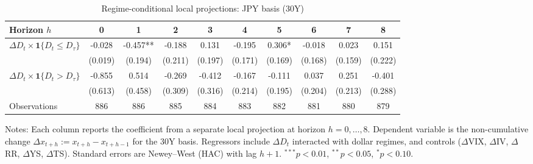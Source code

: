 \begin{table}[!htbp]\centering
\caption{Regime-conditional local projections: JPY basis (30Y)}
\label{tab:lp_jpy_30y}
\begin{tabular}{lccccccccc}
\toprule
Horizon $h$ & 0 & 1 & 2 & 3 & 4 & 5 & 6 & 7 & 8 \\
\midrule
$\Delta D_t \times \mathbf{1}\{D_t \le D_\tau\}$ & -0.028 & -0.457** & -0.188 & 0.131 & -0.195 & 0.306* & -0.018 & 0.023 & 0.151 \\
  & (0.019) & (0.194) & (0.211) & (0.197) & (0.171) & (0.169) & (0.168) & (0.159) & (0.222) \\
$\Delta D_t \times \mathbf{1}\{D_t > D_\tau\}$ & -0.855 & 0.514 & -0.269 & -0.412 & -0.167 & -0.111 & 0.037 & 0.251 & -0.401 \\
  & (0.613) & (0.458) & (0.309) & (0.316) & (0.214) & (0.195) & (0.204) & (0.213) & (0.288) \\
\midrule
Observations & 886 & 886 & 885 & 884 & 883 & 882 & 881 & 880 & 879 \\
\bottomrule
\end{tabular}
\begin{flushleft}\footnotesize Notes: Each column reports the coefficient from a separate local projection at horizon $h=0,\dots,8$. Dependent variable is the non-cumulative change $\Delta x_{t+h}:=x_{t+h}-x_{t+h-1}$ for the 30Y basis. Regressors include $\Delta D_t$ interacted with dollar regimes, and controls ($\Delta$VIX, $\Delta$IV, $\Delta$RR, $\Delta$YS, $\Delta$TS). Standard errors are Newey--West (HAC) with lag $h+1$. $^{***}p<0.01$, $^{**}p<0.05$, $^{*}p<0.10$.\end{flushleft}
\end{table}